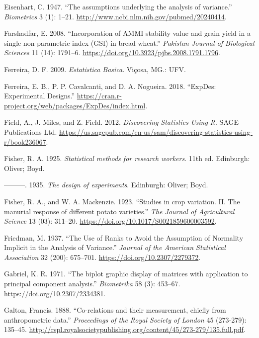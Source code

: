 \documentclass[
]{book}
\numberwithin{equation}{section}
\newlength{\cslhangindent}
\newenvironment{cslreferences}%
  {\setlength{\parindent}{0pt}%
  \everypar{\setlength{\hangindent}{\cslhangindent}}\ignorespaces}%
  {\par}
\begin{document}
\begin{cslreferences}
\leavevmode\hypertarget{ref-Eisenhart1947}{}%
Eisenhart, C. 1947. ``The assumptions underlying the analysis of variance.'' \emph{Biometrics} 3 (1): 1--21. \url{http://www.ncbi.nlm.nih.gov/pubmed/20240414}.

\leavevmode\hypertarget{ref-Farshadfar2008}{}%
Farshadfar, E. 2008. ``Incorporation of AMMI stability value and grain yield in a single non-parametric index (GSI) in bread wheat.'' \emph{Pakistan Journal of Biological Sciences} 11 (14): 1791--6. \url{https://doi.org/10.3923/pjbs.2008.1791.1796}.

\leavevmode\hypertarget{ref-Ferreira2009}{}%
Ferreira, D. F. 2009. \emph{Estatistica Basica}. Viçosa, MG.: UFV.

\leavevmode\hypertarget{ref-Ferreira2018}{}%
Ferreira, E. B., P. P. Cavalcanti, and D. A. Nogueira. 2018. ``ExpDes: Experimental Designs.'' \url{https://cran.r-project.org/web/packages/ExpDes/index.html}.

\leavevmode\hypertarget{ref-Field2012}{}%
Field, A., J. Miles, and Z. Field. 2012. \emph{Discovering Statistics Using R}. SAGE Publications Ltd. \url{https://us.sagepub.com/en-us/sam/discovering-statistics-using-r/book236067}.

\leavevmode\hypertarget{ref-Fisher1925}{}%
Fisher, R. A. 1925. \emph{Statistical methods for research workers}. 11th ed. Edinburgh: Oliver; Boyd.

\leavevmode\hypertarget{ref-Fisher1935}{}%
---------. 1935. \emph{The design of experiments}. Edinburgh: Oliver; Boyd.

\leavevmode\hypertarget{ref-Fisher1923}{}%
Fisher, R. A., and W. A. Mackenzie. 1923. ``Studies in crop variation. II. The manurial response of different potato varieties.'' \emph{The Journal of Agricultural Science} 13 (03): 311--20. \url{https://doi.org/10.1017/S0021859600003592}.

\leavevmode\hypertarget{ref-Friedman1937}{}%
Friedman, M. 1937. ``The Use of Ranks to Avoid the Assumption of Normality Implicit in the Analysis of Variance.'' \emph{Journal of the American Statistical Association} 32 (200): 675--701. \url{https://doi.org/10.2307/2279372}.

\leavevmode\hypertarget{ref-Gabriel1971}{}%
Gabriel, K. R. 1971. ``The biplot graphic display of matrices with application to principal component analysis.'' \emph{Biometrika} 58 (3): 453--67. \url{https://doi.org/10.2307/2334381}.

\leavevmode\hypertarget{ref-Galton1888}{}%
Galton, Francis. 1888. ``Co-relations and their measurement, chiefly from anthropometric data.'' \emph{Proceedings of the Royal Society of London} 45 (273-279): 135--45. \url{http://rspl.royalsocietypublishing.org/content/45/273-279/135.full.pdf}.


\end{cslreferences}
\end{document}
